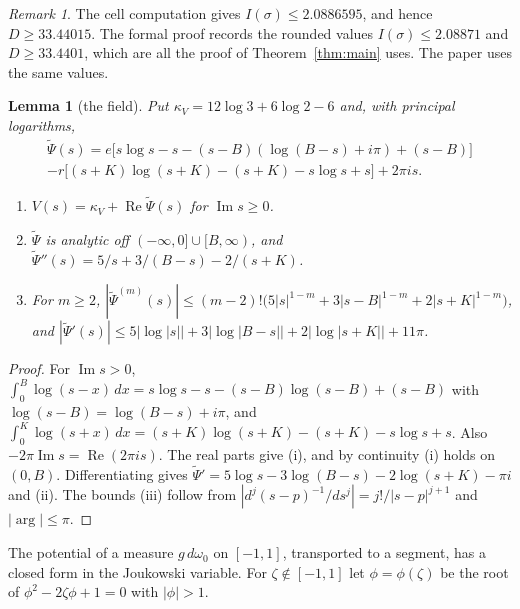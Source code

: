\documentclass[11pt]{amsart}
\newtheorem{lemma}[theorem]{Lemma}
\theoremstyle{definition}
\theoremstyle{remark}
\newtheorem{remark}[theorem]{Remark}
\numberwithin{equation}{section}
\begin{document}
\begin{remark}\label{rem:Dsharper}
The cell computation gives $I(\sigma)\le2.0886595$, and hence $D\ge33.44015$. The formal proof records the rounded
values $I(\sigma)\le2.08871$ and $D\ge33.4401$, which are all the proof of Theorem~\ref{thm:main} uses. The paper uses
the same values.
\end{remark}

\begin{lemma}[the field]\label{lem:V}
Put $\kappa_V=12\log3+6\log2-6$ and, with principal logarithms,
\begin{multline*}
 \widetilde\Psi(s)=e\bigl[s\log s-s-(s-B)(\log(B-s)+i\pi)+(s-B)\bigr]\\
 -r\bigl[(s+K)\log(s+K)-(s+K)-s\log s+s\bigr]+2\pi is.
\end{multline*}
\begin{enumerate}[label=(\roman*)]
\item $V(s)=\kappa_V+\operatorname{Re}\widetilde\Psi(s)$ for $\operatorname{Im}s\ge0$.
\item $\widetilde\Psi$ is analytic off $(-\infty,0]\cup[B,\infty)$, and
 $\widetilde\Psi''(s)=5/s+3/(B-s)-2/(s+K)$.
\item For $m\ge2$, $|\widetilde\Psi^{(m)}(s)|\le(m-2)!\bigl(5|s|^{1-m}+3|s-B|^{1-m}+2|s+K|^{1-m}\bigr)$, and
 $|\widetilde\Psi'(s)|\le5|\log|s||+3|\log|B-s||+2|\log|s+K||+11\pi$.
\end{enumerate}
\end{lemma}

\begin{proof}
For $\operatorname{Im}s>0$, $\int_0^B\log(s-x)\,dx=s\log s-s-(s-B)\log(s-B)+(s-B)$ with $\log(s-B)=\log(B-s)+i\pi$, and
$\int_0^K\log(s+x)\,dx=(s+K)\log(s+K)-(s+K)-s\log s+s$. Also $-2\pi\operatorname{Im}s=\operatorname{Re}(2\pi is)$. The real
parts give (i), and by continuity (i) holds on $(0,B)$. Differentiating gives
$\widetilde\Psi'=5\log s-3\log(B-s)-2\log(s+K)-\pi i$ and (ii). The bounds (iii) follow from
$|d^{j}(s-p)^{-1}/ds^j|=j!/|s-p|^{j+1}$ and $|\arg|\le\pi$.
\end{proof}

The potential of a measure $g\,d\omega_0$ on $[-1,1]$, transported to a segment, has a closed form in the Joukowski
variable. For $\zeta\notin[-1,1]$ let $\phi=\phi(\zeta)$ be the root of $\phi^2-2\zeta\phi+1=0$ with $|\phi|>1$.
\end{document}

